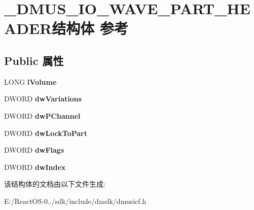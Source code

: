 \hypertarget{struct___d_m_u_s___i_o___w_a_v_e___p_a_r_t___h_e_a_d_e_r}{}\section{\+\_\+\+D\+M\+U\+S\+\_\+\+I\+O\+\_\+\+W\+A\+V\+E\+\_\+\+P\+A\+R\+T\+\_\+\+H\+E\+A\+D\+E\+R结构体 参考}
\label{struct___d_m_u_s___i_o___w_a_v_e___p_a_r_t___h_e_a_d_e_r}
\subsection*{Public 属性}
\begin{DoxyCompactItemize}
\item 
\mbox{\label{struct___d_m_u_s___i_o___w_a_v_e___p_a_r_t___h_e_a_d_e_r_a3c61428f5f779a063bd5beae6b36a319}} 
L\+O\+NG {\bfseries l\+Volume}
\item 
\mbox{\label{struct___d_m_u_s___i_o___w_a_v_e___p_a_r_t___h_e_a_d_e_r_aecaf2eaaef99e5f4d02d24647d7d2239}} 
D\+W\+O\+RD {\bfseries dw\+Variations}
\item 
\mbox{\label{struct___d_m_u_s___i_o___w_a_v_e___p_a_r_t___h_e_a_d_e_r_afcc154a213d585315fe407f92ec5356b}} 
D\+W\+O\+RD {\bfseries dw\+P\+Channel}
\item 
\mbox{\label{struct___d_m_u_s___i_o___w_a_v_e___p_a_r_t___h_e_a_d_e_r_a32c11091b80cb63c9ce36b5309d35cf3}} 
D\+W\+O\+RD {\bfseries dw\+Lock\+To\+Part}
\item 
\mbox{\label{struct___d_m_u_s___i_o___w_a_v_e___p_a_r_t___h_e_a_d_e_r_a26ff49d79e9257de80fd20fc86d73e09}} 
D\+W\+O\+RD {\bfseries dw\+Flags}
\item 
\mbox{\label{struct___d_m_u_s___i_o___w_a_v_e___p_a_r_t___h_e_a_d_e_r_a6e99602a2b9df92cbe797abc56bec5fa}} 
D\+W\+O\+RD {\bfseries dw\+Index}
\end{DoxyCompactItemize}


该结构体的文档由以下文件生成\+:\begin{DoxyCompactItemize}
\item 
E\+:/\+React\+O\+S-\/0../sdk/include/dxsdk/dmusicf.\+h\end{DoxyCompactItemize}
